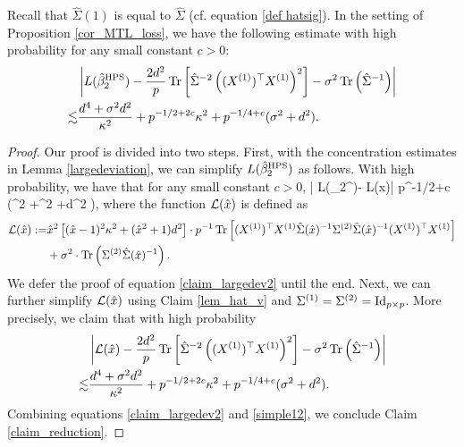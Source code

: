 \begin{claim}\label{claim_reduction}
Recall that $\hat \Sigma(1)$ is equal to $\hat \Sigma$ (cf. equation \eqref{def hatsig}).
In the setting of Proposition \ref{cor_MTL_loss}, we have the following estimate with high probability for any small constant $c>0$:
\begin{align*}
&\left|L(\hat{\beta}_2^{\MTL}) - \frac{2d^2}{p}\tr\left[\hat\Sigma^{-2} \left((X^{(1)})^\top X^{(1)} \right)^2\right] -\sigma^2  \tr\left({\hat \Sigma^{-1}  }\right)\right| \nonumber\\
\lesssim&  \frac{d^4 + \sigma^2 d^2}{\kappa^2}+p^{-1/2+2c}\kappa^2 +  p^{-1/4+c} (\sigma^2 +d^2).
\end{align*}
\end{claim}
\begin{proof}
Our proof is divided into two steps. First, with the concentration estimates in Lemma \ref{largedeviation}, we can simplify $L(\hat{\beta}_2^{\MTL})$ as follows. With high probability, we have that for any small constant $c>0$,
\be\label{claim_largedev2} \left| L(\hat{\beta}_2^{\MTL})- \cal L(\hat x)\right| \le p^{-1/2+c} \left(\sigma^2 +\kappa^2 +d^2 \right),
\ee
where the function $\cal L(\hat x)$ is defined as
\begin{align*}
	\cal L(\hat x)	:=  &\hat x^2\left[(\hat x-1)^2 \kappa^2 +  (\hat x^2+1)d^2 \right] \cdot p^{-1}\bigtr{ (X^{(1)})^{\top}X^{(1)} \hat\Sigma(\hat x)^{-1} \Sigma^{(2)} \hat\Sigma(\hat x)^{-1} (X^{(1)})^{\top}X^{(1)} } \\
	& +\sigma^2\cdot \tr\left(\Sigma^{(2)}\hat \Sigma(\hat x)^{-1}\right).
\end{align*}
We defer the proof of equation \eqref{claim_largedev2} until the end.
Next, we can further simplify $\cal L(\hat x)$ using Claim \ref{lem_hat_v} and $\Sigma^{(1)}=\Sigma^{(2)}=\id_{p\times p}$.
More precisely, we claim that with high probability
\begin{align}
&\left|\cal L(\hat x)- \frac{2d^2}{p} \tr\left[\hat\Sigma^{-2} \left((X^{(1)})^\top X^{(1)} \right)^2\right] -\sigma^2  \tr\left(\hat \Sigma^{-1}  \right)\right| \nonumber\\
\lesssim & \frac{d^4 + \sigma^2 d^2}{\kappa^2}+p^{-1/2+2c}\kappa^2 +  p^{-1/4+c} (\sigma^2 +d^2). \label{simple12}
\end{align}
Combining equations \eqref{claim_largedev2} and \eqref{simple12}, we conclude Claim \ref{claim_reduction}.


\end{proof}
